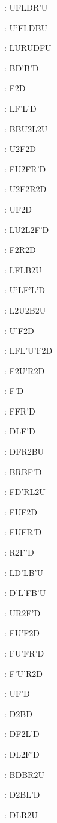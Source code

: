\documentclass[9pt]{article}
\begin{document}
{\begin{multicols}{6}
: UFLDR'U

: U'FLDBU

: LURUDFU

: BD'B'D

: F2D

: LF'L'D

: BBU2L2U

: U2F2D

: FU2FR'D

: U2F2R2D

: UF2D

: LU2L2F'D

: F2R2D

: LFLB2U

: U'LF'L'D

: L2U2B2U

: U'F2D

: LFL'U'F2D

: F2U'R2D

: F'D

: FFR'D

: DLF'D

: DFR2BU

: BRBF'D

: FD'RL2U

: FUF2D

: FUFR'D

: R2F'D

: LD'LB'U

: D'L'FB'U

: UR2F'D

: FU'F2D

: FU'FR'D

: F'U'R2D

: UF'D

: D2BD

: DF2L'D

: DL2F'D

: BDBR2U

: D2BL'D

: DLR2U


\end{multicols}}
\end{document}
